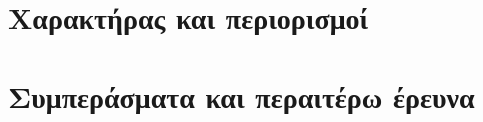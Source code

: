 \section{Χαρακτήρας και περιορισμοί}
  \label{section:02_04_06}
  

\section{Συμπεράσματα και περαιτέρω έρευνα}
  \label{section:02_04_07}
  
